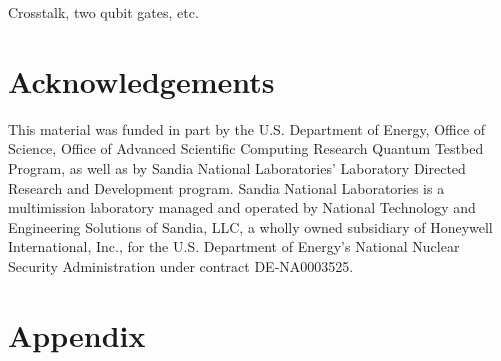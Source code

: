 \documentclass[aps,nofootinbib,pra,notitlepage,twocolumn]{revtex4-1}
\newcommand{\0}{\ensuremath{\mathbf{0}}}
\begin{document}
{Crosstalk, two qubit gates, etc. 



\section{Acknowledgements}
\label{sec:acknowledgements}
This material was funded in part by the U.S. Department of Energy, Office of Science, Office of Advanced Scientific Computing Research Quantum Testbed Program, as well as by Sandia National Laboratories' Laboratory Directed Research and Development program. Sandia National Laboratories is a multimission laboratory managed and operated by National Technology and Engineering Solutions of Sandia, LLC, a wholly owned subsidiary of Honeywell International, Inc., for the U.S. Department of Energy's National Nuclear Security Administration under contract DE-NA0003525.


\section{Appendix}
\label{sec:appendix}

}
\end{document}

